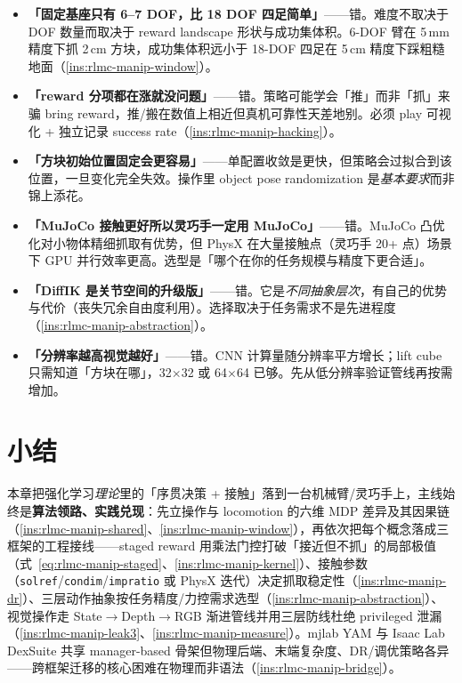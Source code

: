 \begin{pitfall}[本章常见误解一览]
\begin{itemize}
  \item \textbf{「固定基座只有 6--7 DOF，比 18 DOF 四足简单」}——错。难度不取决于 DOF 数量而取决于 reward landscape 形状与成功集体积。6-DOF 臂在 5\,mm 精度下抓 2\,cm 方块，成功集体积远小于 18-DOF 四足在 5\,cm 精度下踩粗糙地面（\cref{ins:rlmc-manip-window}）。
  \item \textbf{「reward 分项都在涨就没问题」}——错。策略可能学会「推」而非「抓」来骗 bring reward，推/搬在数值上相近但真机可靠性天差地别。必须 play 可视化 + 独立记录 success rate（\cref{ins:rlmc-manip-hacking}）。
  \item \textbf{「方块初始位置固定会更容易」}——单配置收敛是更快，但策略会过拟合到该位置，一旦变化完全失效。操作里 object pose randomization 是\emph{基本要求}而非锦上添花。
  \item \textbf{「MuJoCo 接触更好所以灵巧手一定用 MuJoCo」}——错。MuJoCo 凸优化对小物体精细抓取有优势，但 PhysX 在大量接触点（灵巧手 20+ 点）场景下 GPU 并行效率更高。选型是「哪个在你的任务规模与精度下更合适」。
  \item \textbf{「DiffIK 是关节空间的升级版」}——错。它是\emph{不同抽象层次}，有自己的优势与代价（丧失冗余自由度利用）。选择取决于任务需求不是先进程度（\cref{ins:rlmc-manip-abstraction}）。
  \item \textbf{「分辨率越高视觉越好」}——错。CNN 计算量随分辨率平方增长；lift cube 只需知道「方块在哪」，32$\times$32 或 64$\times$64 已够。先从低分辨率验证管线再按需增加。
\end{itemize}
\end{pitfall}

\section*{小结}
\label{sec:rlmc-manip-summary}

本章把强化学习\emph{理论}里的「序贯决策 + 接触」落到一台机械臂/灵巧手上，主线始终是\textbf{算法领路、实践兑现}：先立操作与 locomotion 的六维 MDP 差异及其因果链（\cref{ins:rlmc-manip-shared}、\cref{ins:rlmc-manip-window}），再依次把每个概念落成三框架的工程接线——staged reward 用乘法门控打破「接近但不抓」的局部极值（式~\eqref{eq:rlmc-manip-staged}、\cref{ins:rlmc-manip-kernel}）、接触参数（\verb|solref|/\allowbreak\verb|condim|/\allowbreak\verb|impratio| 或 PhysX 迭代）决定抓取稳定性（\cref{ins:rlmc-manip-dr}）、三层动作抽象按任务精度/力控需求选型（\cref{ins:rlmc-manip-abstraction}）、视觉操作走 State$\to$Depth$\to$RGB 渐进管线并用三层防线杜绝 privileged 泄漏（\cref{ins:rlmc-manip-leak3}、\cref{ins:rlmc-manip-measure}）。mjlab YAM 与 Isaac Lab DexSuite 共享 manager-based 骨架但物理后端、末端复杂度、DR/调优策略各异——跨框架迁移的核心困难在物理而非语法（\cref{ins:rlmc-manip-bridge}）。

